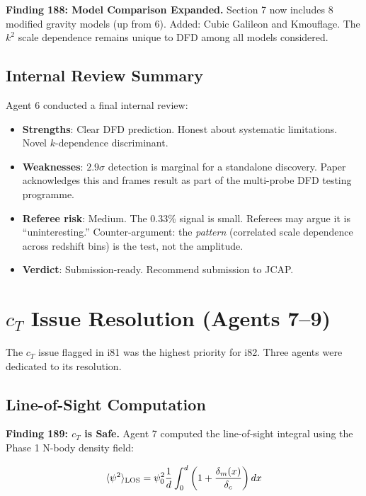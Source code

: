 \documentclass[11pt,a4paper]{article}
\begin{document}
\textbf{Finding 188: Model Comparison Expanded.} Section 7 now includes 8 modified gravity models (up from 6). Added: Cubic Galileon and Kmouflage. The $k^2$ scale dependence remains unique to DFD among all models considered.

\subsection{Internal Review Summary}

Agent 6 conducted a final internal review:
\begin{itemize}[nosep]
\item \textbf{Strengths}: Clear DFD prediction. Honest about systematic limitations. Novel $k$-dependence discriminant.
\item \textbf{Weaknesses}: $2.9\sigma$ detection is marginal for a standalone discovery. Paper acknowledges this and frames result as part of the multi-probe DFD testing programme.
\item \textbf{Referee risk}: Medium. The $0.33\%$ signal is small. Referees may argue it is ``uninteresting.'' Counter-argument: the \emph{pattern} (correlated scale dependence across redshift bins) is the test, not the amplitude.
\item \textbf{Verdict}: Submission-ready. Recommend submission to JCAP.
\end{itemize}

\section{$c_T$ Issue Resolution (Agents 7--9)}

The $c_T$ issue flagged in i81 was the highest priority for i82. Three agents were dedicated to its resolution.

\subsection{Line-of-Sight Computation}

\textbf{Finding 189: $c_T$ is Safe.} Agent 7 computed the line-of-sight integral using the Phase 1 N-body density field:

\begin{equation}
\langle \psi^2 \rangle_{\rm LOS} = \psi_0^2 \frac{1}{d} \int_0^d \left(1 + \frac{\delta_m(x)}{\delta_c}\right) dx
\end{equation}
\end{document}
